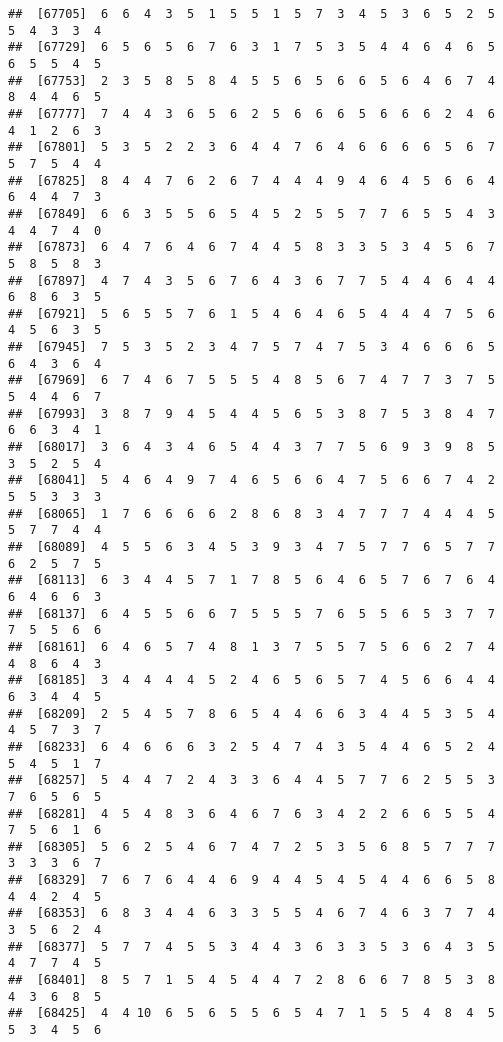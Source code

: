 \documentclass[
]{book}
\begin{document}
\begin{verbatim}
##  [67705]  6  6  4  3  5  1  5  5  1  5  7  3  4  5  3  6  5  2  5  5  4  3  3  4
##  [67729]  6  5  6  5  6  7  6  3  1  7  5  3  5  4  4  6  4  6  5  6  5  5  4  5
##  [67753]  2  3  5  8  5  8  4  5  5  6  5  6  6  5  6  4  6  7  4  8  4  4  6  5
##  [67777]  7  4  4  3  6  5  6  2  5  6  6  6  5  6  6  6  2  4  6  4  1  2  6  3
##  [67801]  5  3  5  2  2  3  6  4  4  7  6  4  6  6  6  6  5  6  7  5  7  5  4  4
##  [67825]  8  4  4  7  6  2  6  7  4  4  4  9  4  6  4  5  6  6  4  6  4  4  7  3
##  [67849]  6  6  3  5  5  6  5  4  5  2  5  5  7  7  6  5  5  4  3  4  4  7  4  0
##  [67873]  6  4  7  6  4  6  7  4  4  5  8  3  3  5  3  4  5  6  7  5  8  5  8  3
##  [67897]  4  7  4  3  5  6  7  6  4  3  6  7  7  5  4  4  6  4  4  6  8  6  3  5
##  [67921]  5  6  5  5  7  6  1  5  4  6  4  6  5  4  4  4  7  5  6  4  5  6  3  5
##  [67945]  7  5  3  5  2  3  4  7  5  7  4  7  5  3  4  6  6  6  5  6  4  3  6  4
##  [67969]  6  7  4  6  7  5  5  5  4  8  5  6  7  4  7  7  3  7  5  5  4  4  6  7
##  [67993]  3  8  7  9  4  5  4  4  5  6  5  3  8  7  5  3  8  4  7  6  6  3  4  1
##  [68017]  3  6  4  3  4  6  5  4  4  3  7  7  5  6  9  3  9  8  5  3  5  2  5  4
##  [68041]  5  4  6  4  9  7  4  6  5  6  6  4  7  5  6  6  7  4  2  5  5  3  3  3
##  [68065]  1  7  6  6  6  6  2  8  6  8  3  4  7  7  7  4  4  4  5  5  7  7  4  4
##  [68089]  4  5  5  6  3  4  5  3  9  3  4  7  5  7  7  6  5  7  7  6  2  5  7  5
##  [68113]  6  3  4  4  5  7  1  7  8  5  6  4  6  5  7  6  7  6  4  6  4  6  6  3
##  [68137]  6  4  5  5  6  6  7  5  5  5  7  6  5  5  6  5  3  7  7  7  5  5  6  6
##  [68161]  6  4  6  5  7  4  8  1  3  7  5  5  7  5  6  6  2  7  4  4  8  6  4  3
##  [68185]  3  4  4  4  4  5  2  4  6  5  6  5  7  4  5  6  6  4  4  6  3  4  4  5
##  [68209]  2  5  4  5  7  8  6  5  4  4  6  6  3  4  4  5  3  5  4  4  5  7  3  7
##  [68233]  6  4  6  6  6  3  2  5  4  7  4  3  5  4  4  6  5  2  4  5  4  5  1  7
##  [68257]  5  4  4  7  2  4  3  3  6  4  4  5  7  7  6  2  5  5  3  7  6  5  6  5
##  [68281]  4  5  4  8  3  6  4  6  7  6  3  4  2  2  6  6  5  5  4  7  5  6  1  6
##  [68305]  5  6  2  5  4  6  7  4  7  2  5  3  5  6  8  5  7  7  7  3  3  3  6  7
##  [68329]  7  6  7  6  4  4  6  9  4  4  5  4  5  4  4  6  6  5  8  4  4  2  4  5
##  [68353]  6  8  3  4  4  6  3  3  5  5  4  6  7  4  6  3  7  7  4  3  5  6  2  4
##  [68377]  5  7  7  4  5  5  3  4  4  3  6  3  3  5  3  6  4  3  5  4  7  7  4  5
##  [68401]  8  5  7  1  5  4  5  4  4  7  2  8  6  6  7  8  5  3  8  4  3  6  8  5
##  [68425]  4  4 10  6  5  6  5  5  6  5  4  7  1  5  5  4  8  4  5  5  3  4  5  6

\end{verbatim}
\end{document}
